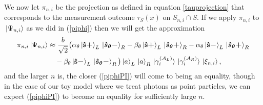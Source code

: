 We now let $\pi_{n,i}$ be the projection as defined in equation \ref{tauprojection} that corresponds to the measurement outcome $\tau_S(x)$ on $S_{n,i}\cap S$. If we apply $\pi_{n,i}$ to $\ket*{\Psi_{n,i}}$ as we did in (\ref{piphi}) then we will get the approximation
\begin{equation}\label{piphiPI}
	\begin{split}
		\pi_{n,i}\ket*{\Psi_{n,i}}&\approx\frac{b}{\sqrt{2}}\big(\alpha_\theta\ket*{{\vb{\hat{{s}}}\bm{+}}}_L\ket*{\bm{\hat{s}_\theta-}}_R
		-\beta_\theta\ket*{{\vb{\hat{{s}}}\bm{+}}}_L\ket*{\bm{\hat{s}_\theta+}}_R-\alpha_\theta\ket*{{\vb{\hat{{s}}}\bm{-}}}_L\ket*{\bm{\hat{s}_\theta+}}_R\\
		&\quad
		-\beta_\theta\ket*{{\vb{\hat{{s}}}\bm{-}}}_L\ket*{\bm{\hat{s}_\theta-}}_R\big)\ket*{a}_L\ket*{a}_R\ket*{\gamma_i^{(\mathcal{A}_L)}}\ket*{\gamma_i^{(\mathcal{A}_R)}}\ket*{\xi_{n,i}},
		\end{split}
\end{equation}
and the larger $n$ is, the closer (\ref{piphiPI}) will come to being an equality, though in the case of our toy model where we treat photons as point particles, we can expect (\ref{piphiPI}) to become an equality for sufficiently large $n$.



